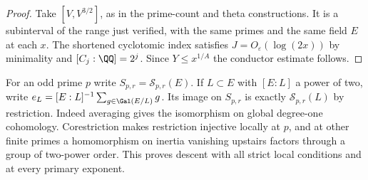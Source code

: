 \documentclass[a4paper,11pt]{article}
\theoremstyle{definition}
\theoremstyle{remark}
\numberwithin{equation}{section}
\newcommand{\Sel}{\mathcal S}
\begin{document}
\begin{proof}
Take \([V,V^{3/2}]\), as in the prime-count and theta
constructions. It is a subinterval of the range just verified,
with the same primes and the same field \(E\) at each \(x\).
The shortened cyclotomic index satisfies \(J=O_\varepsilon(\log(2x))\)
by minimality and \([C_j:\QQ]=2^j\). Since \(Y\le x^{1/A}\)
the conductor estimate follows.
\end{proof}

For an odd prime \(p\) write \(S_{p,r}=\Sel_{p,r}(E)\). If
\(L\subset E\) with \([E:L]\) a power of two, write
\(e_L=[E:L]^{-1}\sum_{g\in\Gal(E/L)}g\). Its image on
\(S_{p,r}\) is exactly \(\Sel_{p,r}(L)\) by restriction.
Indeed averaging gives the isomorphism on global degree-one
cohomology. Corestriction makes restriction injective locally
at \(p\), and at other finite primes a homomorphism on inertia
vanishing upstairs factors through a group of two-power order.
This proves descent with all strict local conditions and at
every primary exponent.
\end{document}
